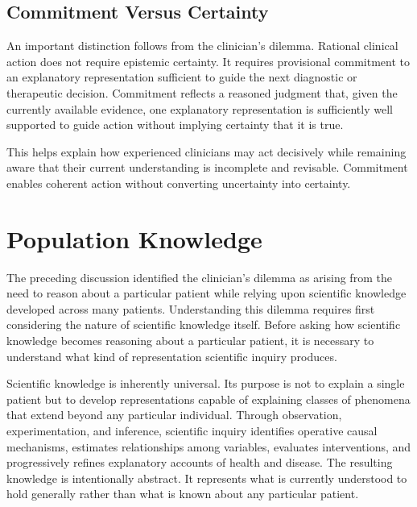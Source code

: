 \documentclass[11pt]{article}
\begin{document}
\subsection{Commitment Versus Certainty}

An important distinction follows from the clinician's dilemma. Rational clinical action does not require epistemic certainty. It requires provisional commitment to an explanatory representation sufficient to guide the next diagnostic or therapeutic decision. Commitment reflects a reasoned judgment that, given the currently available evidence, one explanatory representation is sufficiently well supported to guide action without implying certainty that it is true.

This helps explain how experienced clinicians may act decisively while remaining aware that their current understanding is incomplete and revisable. Commitment enables coherent action without converting uncertainty into certainty.


\section{Population Knowledge}

The preceding discussion identified the clinician's dilemma as arising from the need to reason about a particular patient while relying upon scientific knowledge developed across many patients. Understanding this dilemma requires first considering the nature of scientific knowledge itself. Before asking how scientific knowledge becomes reasoning about a particular patient, it is necessary to understand what kind of representation scientific inquiry produces.

Scientific knowledge is inherently universal. Its purpose is not to explain a single patient but to develop representations capable of explaining classes of phenomena that extend beyond any particular individual. Through observation, experimentation, and inference, scientific inquiry identifies operative causal mechanisms, estimates relationships among variables, evaluates interventions, and progressively refines explanatory accounts of health and disease. The resulting knowledge is intentionally abstract. It represents what is currently understood to hold generally rather than what is known about any particular patient.
\end{document}
